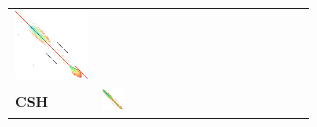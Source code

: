 \begin{figure}[H]
\begin{tabular}{l>{\centering}m{0.12\linewidth}>{\centering}m{0.12\linewidth}>{\centering}m{0.12\linewidth}>{\centering\arraybackslash}m{0.35\linewidth}}
    \includegraphics[scale=0.09]{imgs/comparison/sh-dt.png} \\[1cm]
    \textbf{CSH} &
    \includegraphics[scale=0.09]{imgs/comparison/csh-noprune.png} &

\end{tabular}
\end{figure}
